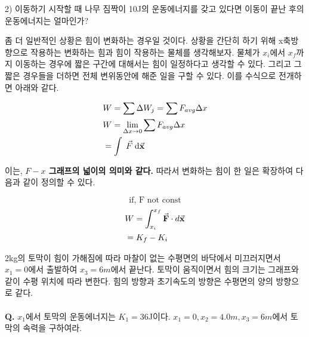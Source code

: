 \begin{flushleft}
\begin{task}[일정한 힘이 한 일]
\begin{flushleft}
  2) 이동하기 시작할 때 나무 짐짝이 10J의 운동에너지를 갖고 있다면 이동이 끝난 후의 운동에너지는 얼마인가?

\end{flushleft}
\end{task}



좀 더 일반적인 상황은 힘이 변화하는 경우일 것이다. 상황을 간단히 하기 위해 x축방향으로 작용하는 변화하는 힘과 
힘이 작용하는 물체를 생각해보자. 물체가 $x_i$에서 $x_f$까지 이동하는 경우에 짧은 구간에 대해서는 힘이 일정하다고 생각할 수 있다.
그리고 그 짧은 경우들을 더하면 전체 변위동안에 해준 일을 구할 수 있다. 이를 수식으로 전개하면 아래와 같다. 

\[
\begin{split}
 &W=\sum\Delta W_j=\sum F_{avg}\Delta x \\
 &W = \lim_{\Delta x \to 0} \sum F_{avg} \Delta x\\
 &= \int \; \vec{F} \; \textrm{d}\va{x} 
\end{split}
\]



이는, \textbf{$F-x$ 그래프의 넓이의 의미와 같다.} 따라서 변화하는 힘이 한 일은 확장하여 다음과 같이 정의할 수 있다. 

\begin{defn}[변화하는 힘이 한 일]
\[ 
  \textrm{if, F not const}
\]
\begin{align}
 &W =\int_{x_i}^{x_f}\va{F} \cdot d\va x\\
 &=K_f-K_i
\end{align}

\end{defn}



\begin{task}[변하는 힘이 한 일]
  \begin{flushleft}
2kg의 토막이 힘이 가해짐에 따라 마찰이 없는 수평면의 바닥에서 미끄러지면서 $x_1=0$에서 출발하여 $x_3=6m$에서 끝난다. 토막이 움직이면서 힘의 크기는
그래프와 같이 수평 위치에 따라 변한다. 힘의 방향과 초기속도의 방향은 수평면의 양의 방향으로 같다.
\phantom{a}\\
\phantom{a}\\
\textbf{Q.} $x_1$에서 토막의 운동에너지는 $K_1=36$J이다. $x_1=0, x_2=4.0m, x_3=6m$에서 토막의 속력을 구하여라. 
\end{flushleft}
\end{task}



\end{flushleft}
